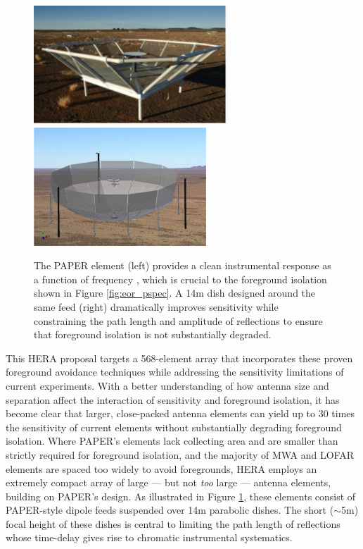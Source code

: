 \documentclass[preprint]{aastex}
\begin{document}
\begin{figure}[!ht]\centering
\includegraphics[height=1.75in]{plots/paper_element.jpg}
\includegraphics[height=1.75in]{plots/hera_dish.png}
\caption{\small
The PAPER element (left) provides a clean instrumental response as a function
of frequency \citep{parsons_et_al2010,parsons_et_al2012b}, which is crucial to
the foreground isolation shown in Figure \ref{fig:eor_pspec}.  A 14m dish
designed around the same feed (right) dramatically improves sensitivity while
constraining the path length and amplitude of
reflections to ensure that foreground isolation is not substantially degraded.  
}\label{fig:hera_dish}
\end{figure}

This HERA proposal targets a 568-element array that incorporates these proven
foreground avoidance techniques while addressing the sensitivity limitations of
current experiments.  With a better understanding of how antenna size and
separation affect the interaction of sensitivity and foreground isolation, it
has become clear that larger, close-packed antenna elements can yield up to 30
times the sensitivity of current elements without substantially degrading
foreground isolation.  Where PAPER’s elements lack collecting area and are
smaller than strictly required for foreground isolation, and the majority of
MWA and LOFAR elements are spaced too widely to avoid foregrounds, HERA employs
an extremely compact array of large --- but not {\it too} large --- antenna
elements, building on PAPER's design.  As illustrated in Figure
\ref{fig:hera_dish}, these elements consist of PAPER-style dipole feeds
suspended over 14m parabolic dishes.  The short ($\sim$5m) focal height of these
dishes is central to limiting the path length of reflections whose time-delay
gives rise to chromatic instrumental systematics. 
\end{document}
